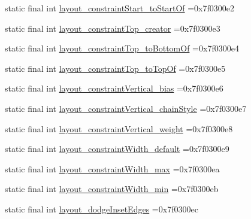 \begin{DoxyCompactItemize}
\item 
static final int \mbox{\hyperlink{classbr_1_1unb_1_1cic_1_1mp_1_1marketmaster_1_1test_1_1R_1_1attr_a4297387be435a53dc50588895bb90ec6}{layout\+\_\+constraint\+Start\+\_\+to\+Start\+Of}} =0x7f0300e2
\item 
static final int \mbox{\hyperlink{classbr_1_1unb_1_1cic_1_1mp_1_1marketmaster_1_1test_1_1R_1_1attr_ad7db96a5dbdf6eea9e7932292eb88f3c}{layout\+\_\+constraint\+Top\+\_\+creator}} =0x7f0300e3
\item 
static final int \mbox{\hyperlink{classbr_1_1unb_1_1cic_1_1mp_1_1marketmaster_1_1test_1_1R_1_1attr_a12b6e81904b109128ca95571711a8d0e}{layout\+\_\+constraint\+Top\+\_\+to\+Bottom\+Of}} =0x7f0300e4
\item 
static final int \mbox{\hyperlink{classbr_1_1unb_1_1cic_1_1mp_1_1marketmaster_1_1test_1_1R_1_1attr_abf04346292a809168bfa9e66c61bfbe9}{layout\+\_\+constraint\+Top\+\_\+to\+Top\+Of}} =0x7f0300e5
\item 
static final int \mbox{\hyperlink{classbr_1_1unb_1_1cic_1_1mp_1_1marketmaster_1_1test_1_1R_1_1attr_aad5161eaa51ddaa217075b4e1a3951b3}{layout\+\_\+constraint\+Vertical\+\_\+bias}} =0x7f0300e6
\item 
static final int \mbox{\hyperlink{classbr_1_1unb_1_1cic_1_1mp_1_1marketmaster_1_1test_1_1R_1_1attr_a1f985345d5cc7091ee908c2a0f5e4b6b}{layout\+\_\+constraint\+Vertical\+\_\+chain\+Style}} =0x7f0300e7
\item 
static final int \mbox{\hyperlink{classbr_1_1unb_1_1cic_1_1mp_1_1marketmaster_1_1test_1_1R_1_1attr_aeb6ddf44db6973458d7d02d55a10c328}{layout\+\_\+constraint\+Vertical\+\_\+weight}} =0x7f0300e8
\item 
static final int \mbox{\hyperlink{classbr_1_1unb_1_1cic_1_1mp_1_1marketmaster_1_1test_1_1R_1_1attr_a2c231f119634fa645650b6d995c8e6ca}{layout\+\_\+constraint\+Width\+\_\+default}} =0x7f0300e9
\item 
static final int \mbox{\hyperlink{classbr_1_1unb_1_1cic_1_1mp_1_1marketmaster_1_1test_1_1R_1_1attr_ab4f8a0d6174d3083d49aa6e2068d4a2a}{layout\+\_\+constraint\+Width\+\_\+max}} =0x7f0300ea
\item 
static final int \mbox{\hyperlink{classbr_1_1unb_1_1cic_1_1mp_1_1marketmaster_1_1test_1_1R_1_1attr_af86a7604267f49eab5a29f21f5e4872d}{layout\+\_\+constraint\+Width\+\_\+min}} =0x7f0300eb
\item 
static final int \mbox{\hyperlink{classbr_1_1unb_1_1cic_1_1mp_1_1marketmaster_1_1test_1_1R_1_1attr_abaca2e27db535a3d2604952f2e8aeeeb}{layout\+\_\+dodge\+Inset\+Edges}} =0x7f0300ec

\end{DoxyCompactItemize}
